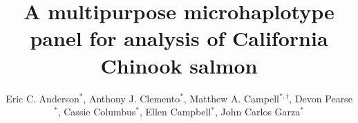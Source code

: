 

\newcommand{\myTitle}{A multipurpose microhaplotype panel for analysis of California Chinook salmon}
\title{\myTitle}

\newcommand{\myAuthors}{Eric C. Anderson$^{*,\S}$, Anthony J. Clemento$^{*}$, Matthew A. Campell$^{*,\dagger}$, Devon Pearse$^{*}$, Cassie Columbus$^{*}$, Ellen Campbell$^{*}$, John Carlos Garza$^{*}$}
\author{Eric C. Anderson$^{*}$, Anthony J. Clemento$^{*}$, Matthew A. Campell$^{*,\dagger}$, Devon Pearse$^{*}$, Cassie Columbus$^{*}$, Ellen Campbell$^{*}$, John Carlos Garza$^{*}$}


\newcommand{\myAffiliations}{
$^*$Southwest Fisheries Science Center, National Marine Fisheries Service, NOAA,Santa Cruz, California, USA. $^\dagger$Current address: Mac's home address in AK.
}

\renewcommand{\AuthorAddresses}{\myAffiliations}

\renewcommand{\KeyWords}{Genetic stock identfication, population assignment, parentage based tagging, amplicon sequencing}

\renewcommand{\CorrespondingAuthor}{eric.c.anderson@noaa.gov}


\newcommand{\myEmailAddress}{eric.c.anderson@noaa.gov}
\newcommand{\myEmailFootnote}{$^\S$}

\newcommand{\myCopyright}{\copyright US Federal Government work in the public domain in the USA}

\newcommand{\myRunningTitle}{Microhaplotypes for California Chinook salmon}
\renewcommand{\RunningTitle}{\myRunningTitle}

\newcommand{\myRunningAuthor}{Anderson et al.}

